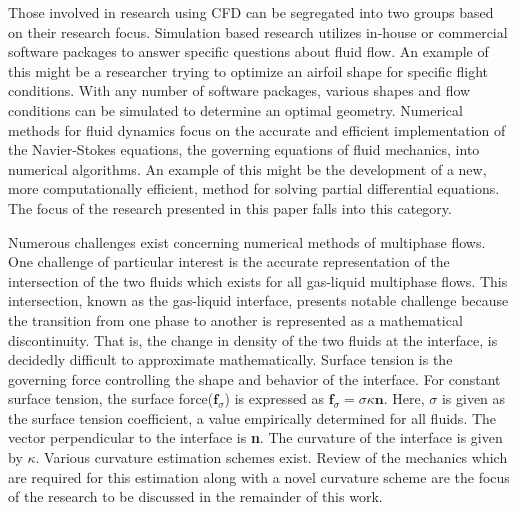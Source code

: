 Those involved in research using CFD can be segregated into two groups based on their research focus. Simulation based research utilizes in-house or commercial software packages to answer specific questions about fluid flow. An example of this might be a researcher trying to optimize an airfoil shape for specific flight conditions. With any number of software packages, various shapes and flow conditions can be simulated to determine an optimal geometry. Numerical methods for fluid dynamics focus on the accurate and efficient implementation of the Navier-Stokes equations, the governing equations of fluid mechanics, into numerical algorithms. An example of this might be the development of a new, more computationally efficient, method for solving partial differential equations. The focus of the research presented in this paper falls into this category. 

Numerous challenges exist concerning numerical methods of multiphase flows. One challenge of particular interest is the accurate representation of the intersection of the two fluids which exists for all gas-liquid multiphase flows. This intersection, known as the gas-liquid interface, presents notable challenge because the transition from one phase to another is represented as a mathematical discontinuity. That is, the change in density of the two fluids at the interface, is decidedly difficult to approximate mathematically. Surface tension is the governing force controlling the shape and behavior of the interface. For constant surface tension, the surface force($\textbf{f}_{\sigma}$) is expressed as $\textbf{f}_{\sigma} = \sigma \kappa \textbf{n}$\cite{desjardins_direct_2013}. Here, $\sigma$ is given as the surface tension coefficient, a value empirically determined for all fluids. The vector perpendicular to the interface is \textbf{n}. The curvature of the interface is given by $\kappa$. Various curvature estimation schemes exist. Review of the mechanics which are required for this estimation along with a novel curvature scheme are the focus of the research to be discussed in the remainder of this work.    

 



